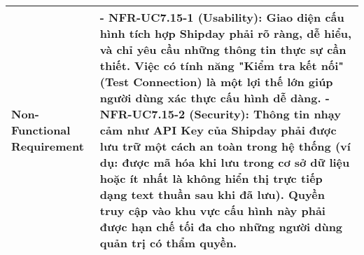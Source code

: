 \begin{longtable}{|m{4cm}|p{11cm}|}
\hline
Non-Functional Requirement & - \textbf{NFR-UC7.15-1 (Usability):} Giao diện cấu hình tích hợp Shipday phải rõ ràng, dễ hiểu, và chỉ yêu cầu những thông tin thực sự cần thiết. Việc có tính năng "Kiểm tra kết nối" (Test Connection) là một lợi thế lớn giúp người dùng xác thực cấu hình dễ dàng. \newline - \textbf{NFR-UC7.15-2 (Security):} Thông tin nhạy cảm như API Key của Shipday phải được lưu trữ một cách an toàn trong hệ thống (ví dụ: được mã hóa khi lưu trong cơ sở dữ liệu hoặc ít nhất là không hiển thị trực tiếp dạng text thuần sau khi đã lưu). Quyền truy cập vào khu vực cấu hình này phải được hạn chế tối đa cho những người dùng quản trị có thẩm quyền. \\
\hline
\end{longtable}

